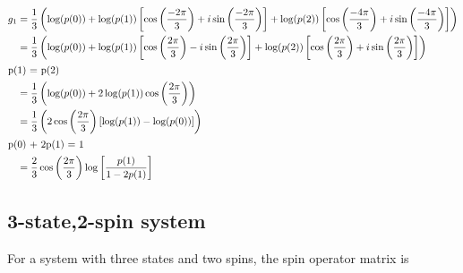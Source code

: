 \begin{align*}
    g_1 &= \frac{1}{3} \left( \log(p(0)) + \log(p(1)) \left[ \cos\left( \frac{-2\pi}{3}\right) + i \sin\left( \frac{-2\pi}{3}\right) \right]  + \log(p(2)) \left[ \cos\left( \frac{-4\pi}{3}\right) + i \sin\left( \frac{-4\pi}{3}\right) \right] \right)\\
    &= \frac{1}{3} \left( \log(p(0)) + \log(p(1)) \left[ \cos\left( \frac{2\pi}{3}\right) - i \sin\left( \frac{2\pi}{3}\right) \right]  + \log(p(2)) \left[ \cos\left( \frac{2\pi}{3}\right) + i \sin\left( \frac{2\pi}{3}\right) \right] \right)\\
    \intertext{p(1) = p(2)}
    &= \frac{1}{3} \left( \log(p(0)) + 2\log(p(1)) \cos\left( \frac{2\pi}{3}\right) \right)\\
    &= \frac{1}{3} \left(2\cos\left( \frac{2\pi}{3}\right) \left[ \log(p(1)) - \log(p(0)) \right] \right)\\
    \intertext{p(0) + 2p(1) = 1}
    &= \frac{2}{3} \cos\left( \frac{2\pi}{3}\right) \log \left[ \frac{p(1)}{1-2p(1)} \right]
\end{align*}

\subsection{3-state,2-spin system}\label{sec:2spins_3states}

For a system with three states and two spins, the spin operator matrix is

